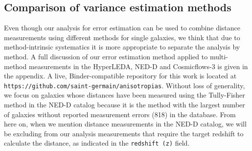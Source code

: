 \documentclass[a4paper,fleqn,usenatbib]{mnras}
\begin{document}
\subsection{Comparison of variance estimation methods}
\label{sec:comp} 


Even though our analysis for error estimation can be used to combine distance measurements using different methods for single galaxies, we think that due to method-intrinsic systematics it is more appropriate to separate the analysis by method. A full discussion of our error estimation method applied to multi-method measurements in the HyperLEDA, NED-D and Cosmicflows-3 is given in the appendix. A live, Binder-compatible repository for this work is located at \texttt{https://github.com/saint-germain/anisotropias}. Without loss of generality, we focus on galaxies whose distances have been measured using the Tully-Fisher method in the NED-D catalog because it is the method with the largest number of galaxies without reported measurement errors (818) in the database. From here on, when we mention distance measurements in the NED-D catalog, we will be excluding from our analysis measurements that require the target redshift to calculate the distance, as indicated in the \texttt{redshift (z)} field. \\
\end{document}
